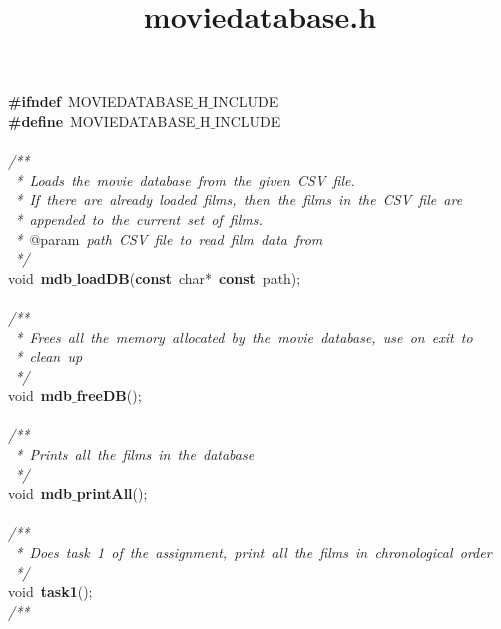 \documentclass{article}
\title{moviedatabase.h}
\date{}
\begin{document}
\maketitle

\noindent
\mbox{}\textbf{\#ifndef}\ MOVIEDATABASE$\_$H$\_$INCLUDE \\
\mbox{}\textbf{\#define}\ MOVIEDATABASE$\_$H$\_$INCLUDE \\
\mbox{} \\
\mbox{}\textit{/**} \\
\mbox{}\textit{\ *\ Loads\ the\ movie\ database\ from\ the\ given\ CSV\ file.} \\
\mbox{}\textit{\ *\ If\ there\ are\ already\ loaded\ films,\ then\ the\ films\ in\ the\ CSV\ file\ are} \\
\mbox{}\textit{\ *\ appended\ to\ the\ current\ set\ of\ films.} \\
\mbox{}\textit{\ *\ }@param\textit{\ path\ CSV\ file\ to\ read\ film\ data\ from} \\
\mbox{}\textit{\ */} \\
\mbox{}void\ \textbf{mdb$\_$loadDB}(\textbf{const}\ char*\ \textbf{const}\ path); \\
\mbox{} \\
\mbox{}\textit{/**} \\
\mbox{}\textit{\ *\ Frees\ all\ the\ memory\ allocated\ by\ the\ movie\ database,\ use\ on\ exit\ to} \\
\mbox{}\textit{\ *\ clean\ up} \\
\mbox{}\textit{\ */} \\
\mbox{}void\ \textbf{mdb$\_$freeDB}(); \\
\mbox{} \\
\mbox{}\textit{/**} \\
\mbox{}\textit{\ *\ Prints\ all\ the\ films\ in\ the\ database} \\
\mbox{}\textit{\ */} \\
\mbox{}void\ \textbf{mdb$\_$printAll}(); \\
\mbox{} \\
\mbox{}\textit{/**} \\
\mbox{}\textit{\ *\ Does\ task\ 1\ of\ the\ assignment,\ print\ all\ the\ films\ in\ chronological\ order} \\
\mbox{}\textit{\ */} \\
\mbox{}void\ \textbf{task1}(); \\
\mbox{}\textit{/**} \\
\end{document}
